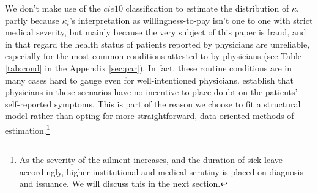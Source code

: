 \documentclass[../main.tex]{subfiles}
\begin{document}
We don't make use of the $cie10$ classification to estimate the distribution of $\kappa$, partly because $\kappa_i$'s interpretation as willingness-to-pay isn't one to one with strict medical severity, but mainly because the very subject of this paper is fraud, and in that regard the health status of patients reported by physicians are unreliable, especially for the most common conditions attested to by physicians (see Table \ref{tab:cond} in the Appendix \ref{sec:par}). In fact, these routine conditions are in many cases hard to gauge even for well-intentioned physicians. \cite{cln} establish that physicians in these scenarios have no incentive to place doubt on the patients' self-reported symptoms. This is part of the reason we choose to fit a structural model rather than opting for more straightforward, data-oriented methods of estimation.\footnote{As the severity of the ailment increases, and the duration of sick leave accordingly, higher institutional and medical scrutiny is placed on diagnosis and issuance. We will discuss this in the next section.}
\end{document}
